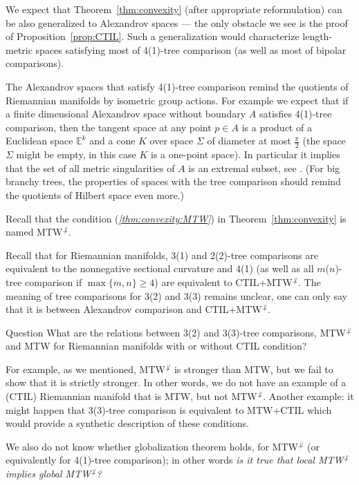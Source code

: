 We expect that Theorem~\ref{thm:convexity} (after appropriate reformulation) can be also generalized to Alexandrov spaces --- the only obstacle we see is the proof of Proposition~\ref{prop:CTIL}.
Such a generalization would characterize length-metric spaces satisfying most of 4(1)-tree comparison (as well as most of bipolar comparisons).

The Alexandrov spaces that satisfy 4(1)-tree comparison remind the quotients of Riemannian manifolds by isometric group actions. 
For example we expect that if a finite dimensional Alexandrov space without boundary $A$ satisfies 4(1)-tree comparison, then the tangent space at any point $p\in A$ is a product of a Euclidean space $\mathbb{E}^k$ and a cone $K$ over space $\Sigma$ of diameter at most $\tfrac\pi2$ (the space $\Sigma$ might be empty, in this case $K$ is a one-point space).
In particular it implies that the set of all metric singularities of $A$ is an extremal subset, see \cite{perelman-petrunin}.
(For big branchy trees, the properties of spaces with the tree comparison should remind the quotients of Hilbert space even more.)

Recall that the condition (\textit{\ref{thm:convexity:MTW}}) in Theorem~\ref{thm:convexity} is named MTW$^{\not\perp}$.

Recall that for Riemannian manifolds, 3(1) and 2(2)-tree comparisons are equivalent to the nonnegative sectional curvature and 4(1) (as well as all $m$($n$)-tree comparison if $\max\{m,n\}\ge 4$) are equivalent to CTIL+MTW$^{\not\perp}$.
The meaning of tree comparisons for 3(2) and 3(3) remains unclear, one can only say that it is between Alexandrov comparison and CTIL+MTW$^{\not\perp}$.

\begin{thm}{Question}
What are the relations between 3(2) and 3(3)-tree comparisons,  MTW$^{\not\perp}$ and MTW for Riemannian manifolds with or without CTIL condition?
\end{thm}

For example, as we mentioned, MTW$^{\not\perp}$ is stronger than MTW, but we fail to show that it is strictly stronger.
In other words, we do not have an example of a (CTIL) Riemannian manifold that is MTW, but not MTW$^{\not\perp}$.
Another example: it might happen that 3(3)-tree comparison is equivalent to MTW+CTIL which would provide a synthetic description of these conditions.

We also do not know whether globalization theorem holds, for MTW$^{\not\perp}$ (or equivalently for 4(1)-tree comparison); in other words \emph{is it true that local MTW$^{\not\perp}$ implies global MTW$^{\not\perp}$?}

